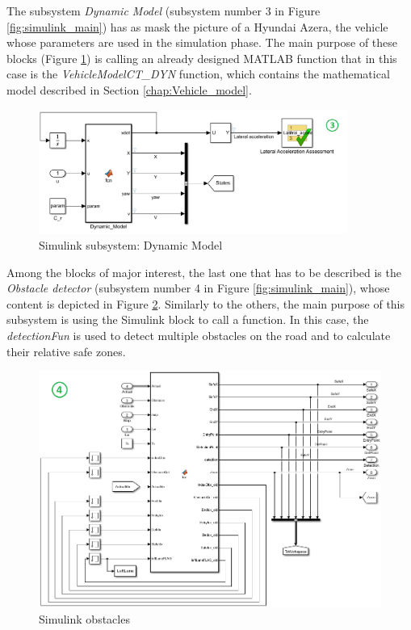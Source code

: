 The subsystem \textit{Dynamic Model} (subsystem number 3 in Figure \ref{fig:simulink_main}) has as mask the picture of a Hyundai Azera, the vehicle whose parameters are used in the simulation phase. The main purpose of these blocks (Figure \ref{fig:simulink_dyn_mod}) is calling an already designed MATLAB function that in this case is the \textit{VehicleModelCT\_DYN} function, which contains the mathematical model described in Section \ref{chap:Vehicle_model}.
\begin{figure}[H]
    \centering
    \includegraphics[width=0.9\textwidth]{Figures/simulink_dyn_mod.png}
    \caption{Simulink subsystem: Dynamic Model}
    \label{fig:simulink_dyn_mod}
\end{figure} 

Among the blocks of major interest, the last one that has to be described is the \textit{Obstacle detector} (subsystem number 4 in Figure \ref{fig:simulink_main}), whose content is depicted in Figure \ref{fig:simulink_obstacles}. Similarly to the others, the main purpose of this subsystem is using the Simulink block to call a function. In this case, the \textit{detectionFun} is used to detect multiple obstacles on the road and to calculate their relative safe zones.

\begin{figure}[H]
    \centering
    \includegraphics[width=\textwidth]{Figures/simulink_obstacles.png}
    \caption{Simulink obstacles}
    \label{fig:simulink_obstacles}
\end{figure} 



